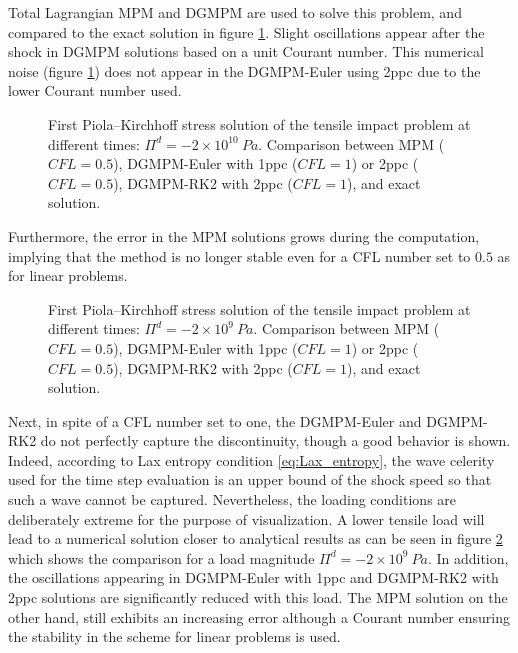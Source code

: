 Total Lagrangian MPM and DGMPM are used to solve this problem, and compared to the exact solution in figure \ref{fig:he_shock}. Slight oscillations appear after the shock in DGMPM solutions based on a unit Courant number. This numerical noise (figure \ref{fig:he_shock}) does not appear in the DGMPM-Euler using 2ppc due to the lower Courant number used.
\begin{figure}[h!]
  \centering
  { \label{subfig:he_shock1}}
  { \label{subfig:he_shock2}}
  {}
  \caption{First Piola–Kirchhoff stress solution of the tensile impact problem at different times: $\Pi^d=-2\times 10^{10} \: Pa$. Comparison between MPM ($CFL=0.5$), DGMPM-Euler with 1ppc ($CFL=1$) or 2ppc ($CFL=0.5$), DGMPM-RK2 with 2ppc ($CFL=1$), and exact solution.}
  \label{fig:he_shock}
\end{figure}
Furthermore, the error in the MPM solutions grows during the computation, implying that the method is no longer stable even for a CFL number set to $0.5$ as for linear problems.
\begin{figure}[h!]
  \centering
  {}
  \caption{First Piola–Kirchhoff stress solution of the tensile impact problem at different times: $\Pi^d=-2\times 10^{9} \: Pa$. Comparison between MPM ($CFL=0.5$), DGMPM-Euler with 1ppc ($CFL=1$) or 2ppc ($CFL=0.5$), DGMPM-RK2 with 2ppc ($CFL=1$), and exact solution.}
  \label{fig:he_low_shock}
\end{figure}
Next, in spite of a CFL number set to one, the DGMPM-Euler and DGMPM-RK2 do not perfectly capture the discontinuity, though a good behavior is shown. Indeed, according to Lax entropy condition \eqref{eq:Lax_entropy}, the wave celerity used for the time step evaluation is an upper bound of the shock speed so that such a wave cannot be captured.
Nevertheless, the loading conditions are deliberately extreme for the purpose of visualization. A lower tensile load will lead to a numerical solution closer to analytical results as can be seen in figure \ref{fig:he_low_shock} which shows the comparison for a load magnitude $\Pi^d=-2\times 10^{9} \: Pa$. In addition, the oscillations appearing in DGMPM-Euler with 1ppc and DGMPM-RK2 with 2ppc solutions are significantly reduced with this load. The MPM solution on the other hand, still exhibits an increasing error although a Courant number ensuring the stability in the scheme for linear problems is used.


